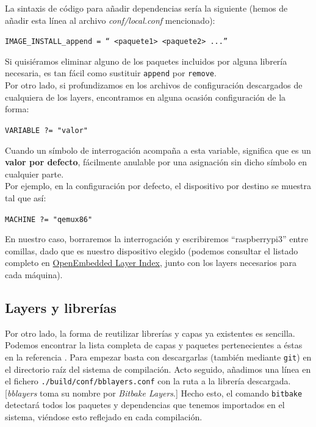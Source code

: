 La sintaxis de código para añadir dependencias sería la siguiente (hemos de añadir esta línea al archivo \textit{conf/local.conf} mencionado):

\begin{center}
\texttt{IMAGE\_INSTALL\_append = `` <paquete1> <paquete2> ...''}
\end{center}

Si quisiéramos eliminar alguno de los paquetes incluidos por alguna librería necesaria, es tan fácil como sustituir \texttt{append} por \texttt{remove}.\\

Por otro lado, si profundizamos en los archivos de configuración descargados de cualquiera de los layers, encontramos en alguna ocasión configuración de la forma:

\begin{center}
\texttt{VARIABLE ?= "valor"}
\end{center}

Cuando un símbolo de interrogación acompaña a esta variable, significa que es un \textbf{valor por defecto}, fácilmente anulable por una asignación sin dicho símbolo en cualquier parte.\\

Por ejemplo, en la configuración por defecto, el dispositivo por destino se muestra tal que así:

\begin{center}
\texttt{MACHINE ?= "qemux86"}
\end{center}

En nuestro caso, borraremos la interrogación y escribiremos ``raspberrypi3'' entre comillas, dado que es nuestro dispositivo elegido (podemos consultar el listado completo en \href{http://layers.openembedded.org/layerindex/branch/master/machines/?q=&browse=1}{OpenEmbedded Layer Index}, junto con los layers necesarios para cada máquina).\\

\subsection{Layers y librerías}

Por otro lado, la forma de reutilizar librerías y capas ya existentes es sencilla. Podemos encontrar la lista completa de capas y paquetes pertenecientes a éstas en la referencia \cite{yocto-layers-list}. Para empezar basta con descargarlas (también mediante \texttt{git}) en el directorio raíz del sistema de compilación. Acto seguido, añadimos una línea en el fichero \texttt{./build/conf/bblayers.conf} con la ruta a la librería descargada. [\textit{bblayers} toma su nombre por \textit{Bitbake Layers}.] Hecho esto, el comando \texttt{bitbake} detectará todos los paquetes y dependencias que tenemos importados en el sistema, viéndose esto reflejado en cada compilación.\\

